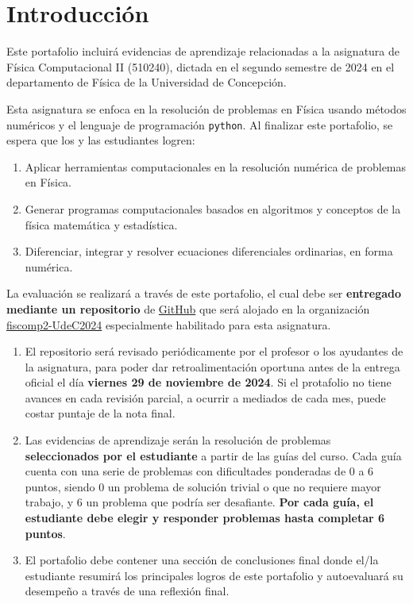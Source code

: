 \documentclass[../portafolio.tex]{subfiles}
\begin{document}

\chapter*{Introducción}

Este portafolio incluirá evidencias de aprendizaje relacionadas
a la asignatura de Física Computacional II (510240), dictada en el
segundo semestre de 2024 en el departamento de Física de la Universidad de Concepción.

\medskip

Esta asignatura se enfoca en la resolución de problemas en Física
usando métodos numéricos y el lenguaje de programación
\texttt{python}. Al finalizar este portafolio, se espera que los y las
estudiantes logren:
\begin{enumerate}
\item Aplicar herramientas computacionales en la resolución
  numérica de problemas en Física.
\item Generar programas computacionales basados en algoritmos y
  conceptos de la física matemática y estadística.
\item Diferenciar, integrar y resolver ecuaciones diferenciales
  ordinarias, en forma numérica.
\end{enumerate}

\medskip

La evaluación se realizará a través de este portafolio, el cual debe
ser \textbf{entregado mediante un repositorio} de
\href{https://github.com}{GitHub} que será alojado en la organización
\href{https://github.com/fiscomp2-UdeC2024}{fiscomp2-UdeC2024}
especialmente habilitado para esta asignatura.

\begin{enumerate}
\item El repositorio será revisado periódicamente por el profesor o los ayudantes de
  la asignatura, para poder dar retroalimentación oportuna antes de la
  entrega oficial el día \textbf{viernes 29 de noviembre de 2024}. Si el protafolio no
  tiene avances en cada revisión parcial, a ocurrir a mediados de cada mes, puede costar puntaje de la nota final.

\item Las evidencias de aprendizaje serán la resolución de problemas
  \textbf{seleccionados por el estudiante} a partir de las guías del
  curso. Cada guía cuenta con una serie de problemas con dificultades
  ponderadas de 0 a 6 puntos, siendo 0 un problema de solución
  trivial o que no requiere mayor trabajo, y 6 un problema que podría ser desafiante. \textbf{Por cada guía,
  el estudiante debe elegir y responder problemas hasta completar 6
  puntos}.
\item El portafolio debe contener una sección de conclusiones final donde
  el/la estudiante resumirá los principales logros de este portafolio
  y autoevaluará su desempeño a través de una reflexión final.
\end{enumerate}
\end{document}
